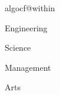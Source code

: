 \newcommand{\BiAppChapter}[2]    %
{\phantomsection  \chapter{#1}   %
 \addcontentsline{toe}{chapter}{\bfseries \sihao Appendix \thechapter~~#2}
}

\renewcommand{\thefigure}{\arabic{chapter}-\arabic{figure}}%

\renewcommand{\thesubfigure}{\alph{subfigure})}%
\renewcommand{\p@subfigure}{\thefigure(} %

\renewcommand{\thetable}{\arabic{chapter}-\arabic{table}}%
\renewcommand{\theequation}{\arabic{chapter}-\arabic{equation}}%

\renewcommand{\algorithmcfname}{算法}
\setlength\AlCapSkip{1.2ex}
\SetAlgoSkip{1pt}
\renewcommand{\algocf@captiontext}[2]{#1\algocf@typo ~ \AlCapFnt{}#2} %
\expandafter\ifx\csname algocf@within\endcsname\relax%
\renewcommand\thealgocf{\@arabic\c@algocf} %
\else%
\renewcommand\thealgocf{\csname the\algocf@within\endcsname-\@arabic\c@algocf}
\fi

\makeatother
\def \xuekeEngineering {Engineering}
\def \xuekeScience {Science}
\def \xuekeManagement {Management}
\def \xuekeArts {Arts}

\ifx \xueke \xuekeEngineering
\newcommand{\cxueke}{工学}
\newcommand{\exueke}{Engineering}
\fi

\ifx \xueke \xuekeScience
\newcommand{\cxueke}{理学}
\newcommand{\exueke}{Science}
\fi

\ifx \xueke \xuekeManagement
\newcommand{\cxueke}{管理学}
\newcommand{\exueke}{Management}
\fi

\ifx \xueke \xuekeArts
\newcommand{\cxueke}{文学}
\newcommand{\exueke}{Arts}
\fi

\newcommand{\cdash}{\mbox{—\!\!\!\!—\!\!\!\!—}}%
\newcommand{\dif}{\mathrm{d}}%
